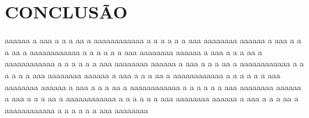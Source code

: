 \chapter{CONCLUSÃO}
aaaaaa a aaa a a a aa a  aaaaaaaaaaaa  a a a a a a   aaa aaaaaaaa
aaaaaa a aaa a a a aa a  aaaaaaaaaaaa  a a a a a a   aaa aaaaaaaa
aaaaaa a aaa a a a aa a  aaaaaaaaaaaa  a a a a a a   aaa aaaaaaaa
aaaaaa a aaa a a a aa a  aaaaaaaaaaaa  a a a a a a   aaa aaaaaaaa
aaaaaa a aaa a a a aa a  aaaaaaaaaaaa  a a a a a a   aaa aaaaaaaa
aaaaaa a aaa a a a aa a  aaaaaaaaaaaa  a a a a a a   aaa aaaaaaaa
aaaaaa a aaa a a a aa a  aaaaaaaaaaaa  a a a a a a   aaa aaaaaaaa
aaaaaa a aaa a a a aa a  aaaaaaaaaaaa  a a a a a a   aaa aaaaaaaa